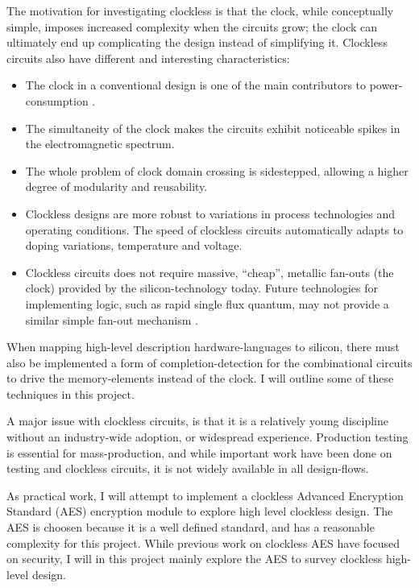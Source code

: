 The motivation for investigating clockless is that the clock, while
conceptually simple, imposes increased complexity when the circuits
grow; the clock can ultimately end up complicating the design instead
of simplifying it. Clockless circuits also have different and
interesting characteristics: 
\begin{itemize}

\item The clock in a conventional design is one of the main
  contributors to power-consumption \cite{tiwari1998reducing}.

\item The simultaneity of the clock makes the circuits exhibit
  noticeable spikes in the electromagnetic spectrum.

\item The whole problem of clock domain crossing is sidestepped,
  allowing a higher degree of modularity and reusability.

\item Clockless designs are more robust to variations in process
  technologies and operating conditions. The speed of clockless
  circuits automatically adapts to doping variations, temperature and
  voltage.

\item Clockless circuits does not require massive, ``cheap'', metallic
  fan-outs (the clock) provided by the silicon-technology today. Future
  technologies for implementing logic, such as rapid single flux
  quantum, may not provide a similar simple fan-out mechanism \cite{rapid}.
\end{itemize}

When mapping high-level description hardware-languages to silicon,
there must also be implemented a form of completion-detection for the
combinational circuits to drive the memory-elements instead of the
clock. I will outline some of these techniques in this project.

A major issue with clockless circuits, is that it is a relatively
young discipline without an industry-wide adoption, or widespread
experience. Production testing is essential for mass-production, and
while important work have been done on testing and clockless
circuits\cite{fullscan}, it is not widely available in all
design-flows.

As practical work, I will attempt to implement a clockless Advanced
Encryption Standard (AES)\cite{rijandael} encryption module to explore
high level clockless design. The AES is choosen because it is a well
defined standard, and has a reasonable complexity for this
project. While previous work on clockless AES\cite{claes} have focused
on security, I will in this project mainly explore the AES to survey
clockless high-level design.

